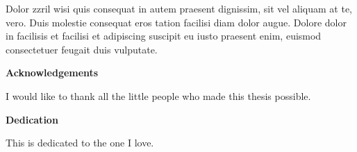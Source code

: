 Dolor zzril wisi quis consequat in autem praesent dignissim, sit vel aliquam at te, vero. Duis molestie consequat eros tation facilisi diam dolor augue. Dolore dolor in facilisis et facilisi et adipiscing suscipit eu iusto praesent enim, euismod consectetuer feugait duis vulputate.

\cleardoublepage


\begin{center}\textbf{Acknowledgements}\end{center}

I would like to thank all the little people who made this thesis possible.
\cleardoublepage


\begin{center}\textbf{Dedication}\end{center}

This is dedicated to the one I love.
\cleardoublepage

\renewcommand\contentsname{Table of Contents}
\tableofcontents
\cleardoublepage
{}    %

\listoffigures
\cleardoublepage
{}		%

\listoftables
\cleardoublepage
{}		%


